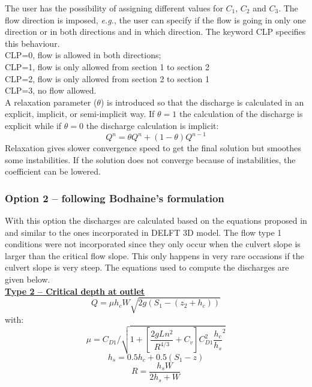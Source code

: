 The user has the possibility of assigning different values for $C_1$, $C_2$ and $C_3$.
The flow direction is imposed, \textit{e.g.}, the user can specify if the flow is going
in only one direction or in both directions and in which direction.
The keyword CLP specifies this behaviour.\\
CLP=0, flow is allowed in both directions;\\
CLP=1, flow is only allowed from section 1 to section 2\\
CLP=2, flow is only allowed from section 2 to section 1\\
CLP=3, no flow allowed.\\
A relaxation parameter ($\theta$) is introduced so that the discharge is calculated
in an explicit, implicit, or semi-implicit way.
If $\theta=1$ the calculation of the discharge is explicit while if $\theta=0$
the discharge calculation is implicit:
\begin{equation}
  Q^n=\theta Q^n + (1-\theta) Q^{n-1}
\end{equation}
Relaxation gives slower convergence speed to get the final solution
but smoothes some instabilities.
If the solution does not converge because of instabilities, the coefficient can be lowered.

\subsubsection{Option 2 -- following Bodhaine's formulation}

With this option the discharges are calculated based on the equations proposed in \cite{Bodhaine1968}
and similar to the ones incorporated in DELFT 3D model.
The flow type 1 conditions were not incorporated since they only
occur when the culvert slope is larger than the critical flow slope.
This only happens in very rare occasions if the culvert slope is very steep.
The equations used to compute the discharges are given below.\\

\underline{\textbf{Type 2 -- Critical depth at outlet}}\\
\begin{equation}
Q = \mu h_c W \sqrt{2g(S_1-(z_2+h_c))}
\end{equation}
with:
\begin{equation}
\mu = C_{D1}/\sqrt{1+\left[\dfrac{2gLn^2}{R^{4/3}} +C_v\right] C_{D1}^2 \dfrac{h_c}{h_s}^2}
\end{equation}
\begin{equation}
h_s=0.5h_c+0.5(S_1-z)
\end{equation}
\begin{equation}
R=\dfrac{h_s W}{2h_s+W}
\end{equation}

